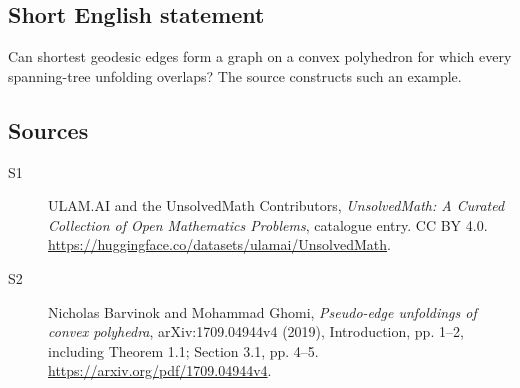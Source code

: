 \documentclass[11pt]{article}
\begin{document}
\subsection{Short English statement}
Can shortest geodesic edges form a graph on a convex polyhedron for which every spanning-tree unfolding overlaps? The source constructs such an example.
\subsection{Sources}
\begin{description}
\item[\hypertarget{source:statement:1}{S1}] ULAM.AI and the UnsolvedMath Contributors, \emph{UnsolvedMath: A Curated Collection of Open Mathematics Problems}, catalogue entry. CC BY 4.0. \url{https://huggingface.co/datasets/ulamai/UnsolvedMath}.
\item[\hypertarget{source:statement:2}{S2}] Nicholas Barvinok and Mohammad Ghomi, \emph{Pseudo-edge unfoldings of convex polyhedra}, arXiv:1709.04944v4 (2019), Introduction, pp. 1--2, including Theorem 1.1; Section 3.1, pp. 4--5. \url{https://arxiv.org/pdf/1709.04944v4}.
\end{description}
\label{end:statement}
\end{document}
